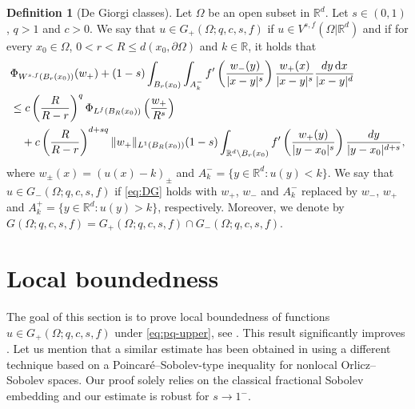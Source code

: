 \documentclass[11pt]{amsart}
\theoremstyle{plain}
\theoremstyle{definition}
\newtheorem{definition}[theorem]{Definition}
\numberwithin{equation}{section}
\renewcommand{\d}{\textnormal{d}}
\newcommand{\dx} {\,\mathrm{d}x}
\newcommand{\R}{\mathbb{R}}
\newcommand{\Rd}{\mathbb{R}^d}
\begin{document}
\begin{definition}[De Giorgi classes] \label{def:DG}
Let $\Omega$ be an open subset in $\Rd$. Let $s \in (0,1)$, $q > 1$ and $c > 0$. We say that $u \in G_+(\Omega; q, c, s, f)$ if $u \in V^{s,f}(\Omega|\Rd)$ and if for every $x_0 \in \Omega$, $0 < r < R \le d(x_0, \partial \Omega)$ and $k \in \R$, it holds that
\begin{equation}
\label{eq:DG}
\begin{split}
&\Phi_{W^{s, f}(B_r(x_0))}(w_+) + (1-s) \int_{B_{r}(x_0)} \int_{A_{k}^{-}} f'\left( \frac{w_{-}(y)}{\vert x-y \vert^s} \right) \frac{w_{+}(x)}{\vert x-y \vert^s} \frac{\d y \dx}{\vert x-y \vert^{d}} \\
&\le c\left(\frac{R}{R-r}\right)^{q} \Phi_{L^f(B_R(x_0))}\left( \frac{w_{+}}{R^s} \right) \\
&\quad +c \left(\frac{R}{R-r} \right)^{d+sq} \Vert w_+ \Vert_{L^1(B_{R}(x_0))} (1-s) \int_{\Rd \setminus B_r(x_0)} f' \left( \frac{w_+(y)}{|y-x_0|^s} \right) \frac{\d y}{|y-x_0|^{d+s}},
\end{split}
\end{equation}
where $w_{\pm}(x) = (u(x)- k)_{\pm}$ and $A_{k}^{-} = \lbrace y \in \Rd: u(y) < k \rbrace$. We say that $u \in G_-(\Omega; q, c, s, f)$ if \eqref{eq:DG} holds with $w_+$, $w_-$ and $A_{k}^{-}$ replaced by $w_-$, $w_+$ and $A_{k}^{+} = \lbrace y \in \Rd: u(y) > k \rbrace$, respectively. Moreover, we denote by $G(\Omega; q, c, s, f) = G_+(\Omega; q, c, s, f) \cap G_-(\Omega; q, c, s, f)$.
\end{definition}

\section{Local boundedness} \label{sec:locbdd}

The goal of this section is to prove local boundedness of functions $u \in G_+(\Omega; q, c, s, f)$ under \eqref{eq:pq-upper}, see . This result significantly improves \cite[Theorem 5.1]{ChKiWe21}. Let us mention that a similar estimate has been obtained in \cite{ByKiOk21} using a different technique based on a Poincar\'e--Sobolev-type inequality for nonlocal Orlicz--Sobolev spaces. Our proof solely relies on the classical fractional Sobolev embedding and our estimate is robust for $s \to 1^{-}$.
\end{document}
